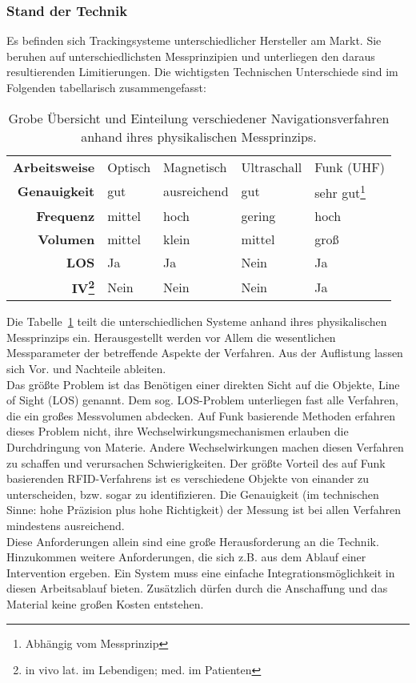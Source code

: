 \subsubsection{Stand der Technik}
Es befinden sich Trackingsysteme unterschiedlicher Hersteller am Markt. Sie beruhen auf unterschiedlichsten Messprinzipien und unterliegen den daraus resultierenden Limitierungen. Die wichtigsten Technischen Unterschiede sind im Folgenden tabellarisch zusammengefasst:
%
\begin{table} [H]
	\begin{center}
		\begin{tabular}{rllll}
			\textbf{Arbeitsweise} & Optisch & Magnetisch & Ultraschall & Funk (UHF) \\
			\textbf{Genauigkeit} & gut & ausreichend & gut & sehr gut\footnote{Abhängig vom Messprinzip} \\
			\textbf{Frequenz} & mittel & hoch & gering & hoch \\
			\textbf{Volumen} & mittel & klein & mittel & groß \\
			\textbf{LOS} & Ja & Ja & Nein & Ja \\
			\textbf{IV\footnote{in vivo lat. im Lebendigen; med. im Patienten}} & Nein   & Nein & Nein & Ja \\
%			
		\end{tabular}
	\end{center}
	\caption[Übersicht Navigationsverfahren]{Grobe Übersicht und Einteilung verschiedener Navigationsverfahren anhand ihres physikalischen Messprinzips.}
	\label{tab:overview_tracking}
\end{table}
%
Die Tabelle~\ref{tab:overview_tracking} teilt die unterschiedlichen Systeme anhand ihres physikalischen Messprinzips ein. Herausgestellt werden vor Allem die wesentlichen Messparameter der betreffende Aspekte der Verfahren. Aus der Auflistung lassen sich Vor. und Nachteile ableiten.\\
Das größte Problem ist das Benötigen einer direkten Sicht auf die Objekte, Line of Sight (LOS) genannt. Dem sog. LOS-Problem unterliegen fast alle Verfahren, die ein großes Messvolumen abdecken. Auf Funk basierende Methoden erfahren dieses Problem nicht, ihre Wechselwirkungsmechanismen erlauben die Durchdringung von Materie. Andere Wechselwirkungen machen diesen Verfahren zu schaffen und verursachen Schwierigkeiten. Der größte Vorteil des auf Funk basierenden RFID-Verfahrens ist es verschiedene Objekte von einander zu unterscheiden, bzw. sogar zu identifizieren. Die Genauigkeit (im technischen Sinne: hohe Präzision plus hohe Richtigkeit) der Messung ist bei allen Verfahren mindestens ausreichend. \\
Diese Anforderungen allein sind eine große Herausforderung an die Technik. Hinzukommen weitere Anforderungen, die sich z.B. aus dem Ablauf einer Intervention ergeben. Ein System muss eine einfache Integrationsmöglichkeit in diesen Arbeitsablauf bieten. Zusätzlich dürfen durch die Anschaffung und das Material keine großen Kosten entstehen.\\
%
